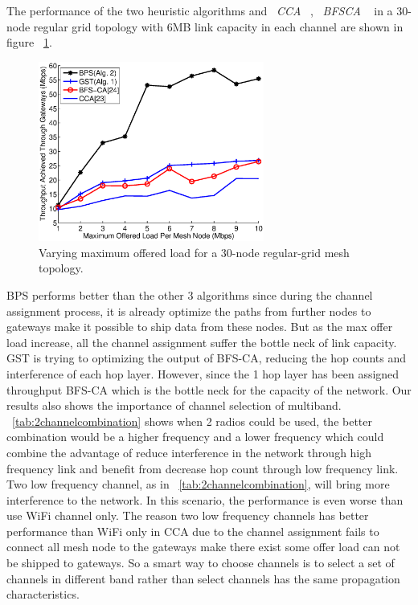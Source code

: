    The performance of the two heuristic algorithms and ~\emph{CCA} ~\cite{draves2004routing}, ~\emph{BFSCA}  ~\cite{ramachandran2006interference} in a 30-node regular grid topology with 6MB link capacity in each channel are shown in figure ~\ref{fig:maxtpt}.

   \begin{figure}
   \centering
   \includegraphics[width=74mm]{figures/maxtpt}
   \vspace{-0.1in}
   \caption{Varying maximum offered load for a 30-node regular-grid mesh topology.}                                                                               
   \label{fig:maxtpt}
   \end{figure}
 
   BPS performs better than the other 3 algorithms since during the channel assignment process, it is already optimize the paths from further nodes to gateways make it possible to ship data from these nodes. But as the max offer load increase, all the channel assignment suffer the bottle neck of link capacity.
   GST is trying to optimizing the output of BFS-CA, reducing the hop counts and interference of each hop layer. However, since the 1 hop layer has been assigned throughput BFS-CA which is the bottle neck for the capacity of the network.
   Our results also shows the importance of channel selection of multiband. ~\ref{tab:2channelcombination} shows when 2 radios could be used, the better combination would be a higher frequency and a lower frequency which could combine the advantage of reduce interference in the network through high frequency link and benefit from decrease hop count through low frequency link. 
Two low frequency channel, as in ~\ref{tab:2channelcombination}, will bring more interference to the network.
In this scenario, the performance is even worse than use WiFi channel only. 
The reason two low frequency channels has better performance than WiFi only in CCA due to the channel assignment fails to connect all mesh node to the gateways make there exist some offer load can not be shipped to gateways.
So a smart way to choose channels is to select a set of channels in different band rather than select channels has the same propagation characteristics.

